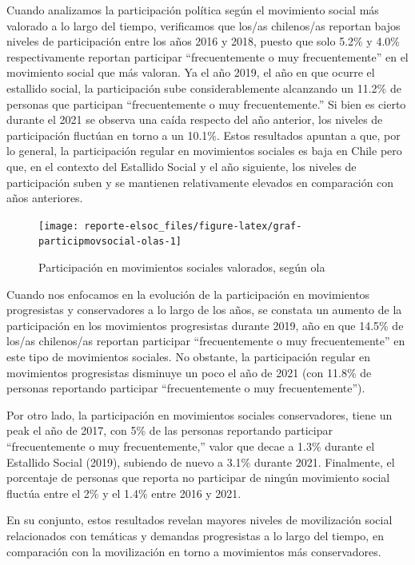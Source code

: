 \documentclass[
  12pt,
]{book}
\begin{document}
Cuando analizamos la participación política según el movimiento social más valorado a lo largo del tiempo, verificamos que los/as chilenos/as reportan bajos niveles de participación entre los años 2016 y 2018, puesto que solo 5.2\% y 4.0\% respectivamente reportan participar ``frecuentemente o muy frecuentemente'' en el movimiento social que más valoran. Ya el año 2019, el año en que ocurre el estallido social, la participación sube considerablemente alcanzando un 11.2\% de personas que participan ``frecuentemente o muy frecuentemente.'' Si bien es cierto durante el 2021 se observa una caída respecto del año anterior, los niveles de participación fluctúan en torno a un 10.1\%. Estos resultados apuntan a que, por lo general, la participación regular en movimientos sociales es baja en Chile pero que, en el contexto del Estallido Social y el año siguiente, los niveles de participación suben y se mantienen relativamente elevados en comparación con años anteriores.

\begin{figure}

{\centering \texttt{[image: reporte-elsoc\_files/figure-latex/graf-participmovsocial-olas-1]} 

}

\caption{Participación en movimientos sociales valorados, según ola}\label{fig:graf-participmovsocial-olas}
\end{figure}

Cuando nos enfocamos en la evolución de la participación en movimientos progresistas y conservadores a lo largo de los años, se constata un aumento de la participación en los movimientos progresistas durante 2019, año en que 14.5\% de los/as chilenos/as reportan participar ``frecuentemente o muy frecuentemente'' en este tipo de movimientos sociales. No obstante, la participación regular en movimientos progresistas disminuye un poco el año de 2021 (con 11.8\% de personas reportando participar ``frecuentemente o muy frecuentemente'').

Por otro lado, la participación en movimientos sociales conservadores, tiene un peak el año de 2017, con 5\% de las personas reportando participar ``frecuentemente o muy frecuentemente,'' valor que decae a 1.3\% durante el Estallido Social (2019), subiendo de nuevo a 3.1\% durante 2021. Finalmente, el porcentaje de personas que reporta no participar de ningún movimiento social fluctúa entre el 2\% y el 1.4\% entre 2016 y 2021.

En su conjunto, estos resultados revelan mayores niveles de movilización social relacionados con temáticas y demandas progresistas a lo largo del tiempo, en comparación con la movilización en torno a movimientos más conservadores.
\end{document}
